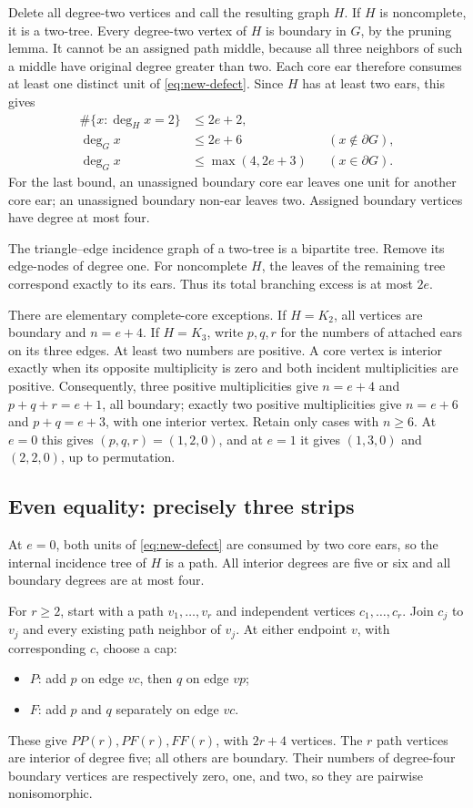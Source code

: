 Delete all degree-two vertices and call the resulting graph $H$.
If $H$ is noncomplete, it is a two-tree.  Every degree-two vertex of
$H$ is boundary in $G$, by the pruning lemma.  It cannot be an assigned
path middle, because all three neighbors of such a middle have
original degree greater than two.  Each core ear therefore consumes
at least one distinct unit of \eqref{eq:new-defect}.  Since $H$ has at
least two ears, this gives
\begin{equation}
 \begin{aligned}
 \#\{x:\deg_Hx=2\}&\le 2e+2,\\
 \deg_Gx&\le2e+6 &&(x\notin\partial G),\\
 \deg_Gx&\le\max(4,2e+3) &&(x\in\partial G).
 \end{aligned}
 \label{eq:new-structure}
\end{equation}
For the last bound, an unassigned boundary core ear leaves one unit
for another core ear; an unassigned boundary non-ear leaves two.
Assigned boundary vertices have degree at most four.

The triangle--edge incidence graph of a two-tree is a bipartite tree.
Remove its edge-nodes of degree one.  For noncomplete $H$, the leaves
of the remaining tree correspond exactly to its ears.  Thus its total
branching excess is at most $2e$.

There are elementary complete-core exceptions.  If $H=K_2$, all
vertices are boundary and $n=e+4$.  If $H=K_3$, write $p,q,r$ for the
numbers of attached ears on its three edges.  At least two numbers
are positive.  A core vertex is interior exactly when its opposite
multiplicity is zero and both incident multiplicities are positive.
Consequently, three positive multiplicities give $n=e+4$ and
$p+q+r=e+1$, all boundary; exactly two positive multiplicities give
$n=e+6$ and $p+q=e+3$, with one interior vertex.  Retain only cases
with $n\ge6$.  At $e=0$ this gives $(p,q,r)=(1,2,0)$, and at $e=1$
it gives $(1,3,0)$ and $(2,2,0)$, up to permutation.

\subsection{Even equality: precisely three strips}

At $e=0$, both units of \eqref{eq:new-defect} are consumed by two core
ears, so the internal incidence tree of $H$ is a path.  All interior
degrees are five or six and all boundary degrees are at most four.

For $r\ge2$, start with a path $v_1,\ldots,v_r$ and independent
vertices $c_1,\ldots,c_r$.  Join $c_j$ to $v_j$ and every existing
path neighbor of $v_j$.  At either endpoint $v$, with corresponding
$c$, choose a cap:
\begin{itemize}
\item $P$: add $p$ on edge $vc$, then $q$ on edge $vp$;
\item $F$: add $p$ and $q$ separately on edge $vc$.
\end{itemize}
These give $PP(r),PF(r),FF(r)$, with $2r+4$ vertices.  The $r$ path
vertices are interior of degree five; all others are boundary.  Their
numbers of degree-four boundary vertices are respectively zero, one,
and two, so they are pairwise nonisomorphic.

